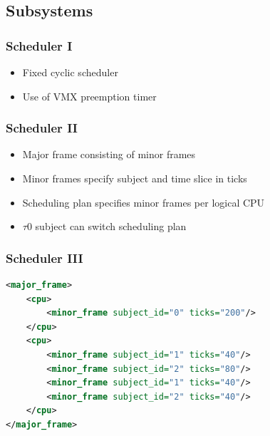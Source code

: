 \documentclass[xcolor={dvipsnames}]{beamer}
\begin{document}
\subsection{Subsystems}
\begin{frame}\frametitle{Scheduler I}
\begin{itemize}
	\item Fixed cyclic scheduler
	\item Use of VMX preemption timer
\end{itemize}
\begin{center}
	
\end{center}
\end{frame}

\begin{frame}\frametitle{Scheduler II}
\begin{itemize}
	\item Major frame consisting of minor frames
	\item Minor frames specify subject and time slice in ticks
	\item Scheduling plan specifies minor frames per logical CPU
	\item $\tau$0 subject can switch scheduling plan
\end{itemize}

\begin{center}
	\noindent\resizebox{\textwidth}{!}{}
\end{center}
\end{frame}

\begin{frame}[fragile]\frametitle{Scheduler III}
\begin{lstlisting}[language=xml]
<major_frame>
    <cpu>
        <minor_frame subject_id="0" ticks="200"/>
    </cpu>
    <cpu>
        <minor_frame subject_id="1" ticks="40"/>
        <minor_frame subject_id="2" ticks="80"/>
        <minor_frame subject_id="1" ticks="40"/>
        <minor_frame subject_id="2" ticks="40"/>
    </cpu>
</major_frame>
\end{lstlisting}

\begin{center}
	\noindent\resizebox{\textwidth}{!}{}
\end{center}
\end{frame}
\end{document}
